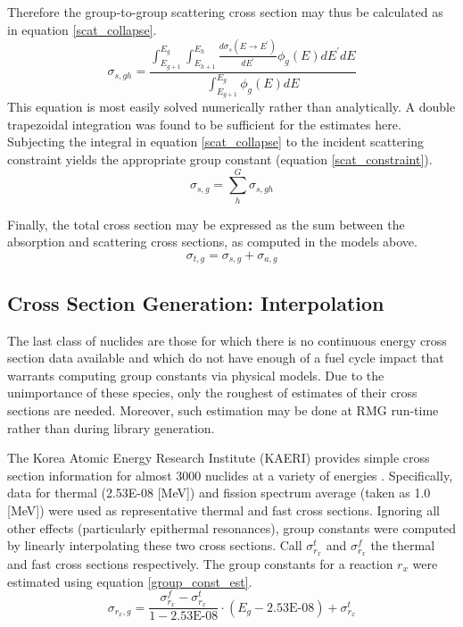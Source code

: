 Therefore the group-to-group scattering cross section may thus be calculated as in equation \ref{scat_collapse}.
\begin{equation}
\label{scat_collapse}
\sigma_{s,gh} = \frac{\int_{E_{g+1}}^{E_g} \int_{E_{h+1}}^{E_h} \frac{d\sigma_s(E\to E^\prime)}{dE^\prime}  \phi_g(E) dE^\prime dE}
                     {\int_{E_{g+1}}^{E_g} \phi_g(E) dE}
\end{equation}
This equation is most easily solved numerically rather than analytically.
A double trapezoidal integration was found to be sufficient for the estimates here.
Subjecting the integral in equation \ref{scat_collapse} 
to the incident scattering constraint yields the appropriate group constant (equation \ref{scat_constraint}).
\begin{equation}
\label{scat_constraint}
\sigma_{s,g} = \sum_h^G \sigma_{s,gh}
\end{equation}

Finally, the total cross section may be expressed as the sum between the absorption and scattering
cross sections, as computed in the models above.
\begin{equation}
\label{tot_xs_model}
\sigma_{t,g} = \sigma_{s,g} + \sigma_{a,g}
\end{equation}

\subsection{Cross Section Generation: Interpolation}
\label{mg:xs_gen_interpolation}
The last class of nuclides are those for which there is no continuous energy cross section data 
available and which do not have enough of a fuel cycle impact that warrants computing group constants 
via physical models.  Due to the unimportance of these species, only the roughest of estimates
of their cross sections are needed.  Moreover, such estimation may be done at RMG run-time rather 
than during library generation.

The Korea Atomic Energy Research Institute (KAERI) provides simple cross section information
for almost 3000 nuclides at a variety of energies \cite{KAER2000}.  Specifically, data for
thermal (2.53E-08 [MeV]) and fission spectrum average (taken as 1.0 [MeV]) were used as representative
thermal and fast cross sections.  Ignoring all other effects (particularly epithermal resonances), 
group constants were computed by linearly interpolating these two cross sections.  Call 
$\sigma_{r_x}^t$ and $\sigma_{r_x}^f$ the thermal and fast cross sections respectively.  The group
constants for a reaction $r_x$ were estimated using equation \ref{group_const_est}.
\begin{equation}
\label{group_const_est}
\sigma_{r_x,g} = \frac{\sigma_{r_x}^f - \sigma_{r_x}^t}{1 - \mbox{2.53E-08}} \cdot (E_g - \mbox{2.53E-08}) + \sigma_{r_x}^t
\end{equation}

